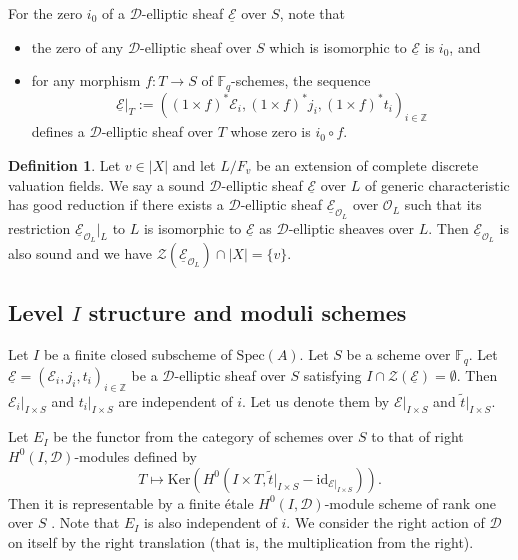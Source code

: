 \documentclass[10pt]{amsart}
\theoremstyle{plain}
\theoremstyle{definition}
\newtheorem{dfn}[thm]{Definition}
\newcommand{\id}{\mathrm{id}}
\newcommand{\Ker}{\mathrm{Ker}}
\newcommand{\Spec}{\mathrm{Spec}}
\newcommand{\cE}{\mathcal{E}}
\newcommand{\cO}{\mathcal{O}}
\newcommand{\cZ}{\mathcal{Z}}
\newcommand{\ucE}{\underline{\mathcal{E}}}
\newcommand{\bF}{\mathbb{F}}
\newcommand{\bZ}{\mathbb{Z}}
\newcommand{\sD}{\mathscr{D}}
\begin{document}
For the zero $i_0$ of a $\sD$-elliptic sheaf $\ucE$ over $S$, note that
\begin{itemize}
	\item the zero of any $\sD$-elliptic sheaf over $S$ which is isomorphic to $\ucE$ is $i_0$, and
	\item for any morphism $f:T\to S$ of $\bF_q$-schemes, the sequence
	\[
	\ucE|_T:=((1\times f)^*\cE_i,(1\times f)^*j_i,(1\times f)^*t_i)_{i\in \bZ}
	\]
	defines a $\sD$-elliptic sheaf over $T$ whose zero is $i_0\circ f$.
\end{itemize}


\begin{dfn}\label{DefGoodRed}
Let $v\in |X|$ and let $L/F_v$ be an extension of complete discrete valuation fields.
We say a sound $\sD$-elliptic sheaf $\ucE$ over $L$ of generic characteristic has good reduction 
if there exists a $\sD$-elliptic sheaf $\ucE_{\cO_L}$ over $\cO_L$ 
such that its restriction $\ucE_{\cO_L}|_L$ to $L$ is isomorphic to $\ucE$ as $\sD$-elliptic sheaves over $L$. 
Then $\ucE_{\cO_L}$ is also sound and we have $\cZ(\ucE_{\cO_L})\cap |X|=\{v\}$.
\end{dfn}



\subsection{Level $I$ structure and moduli schemes}\label{SubsecLevelStr}

Let $I$ be a finite closed subscheme of $\Spec(A)$. 
Let $S$ be a scheme over $\bF_q$.
Let $\underline{\cE}=(\cE_i,j_i,t_i)_{i\in \bZ}$ be a $\sD$-elliptic sheaf over $S$ 
satisfying $I\cap \cZ(\ucE)=\emptyset$.
Then $\cE_i|_{I\times S}$ and $t_i|_{I\times S}$ are independent of $i$.
Let us denote them by
$\cE|_{I\times S}$ and $\tilde{t}|_{I\times S}$.


Let $E_I$ be the functor from the category of schemes over $S$ to that of right $H^0(I,\sD)$-modules defined by
\[
T\mapsto \Ker(H^0(I\times T,\tilde{t}|_{I\times S}-\id_{\cE|_{I\times S}})).
\]
Then it is representable by a finite \'{e}tale $H^0(I,\sD)$-module scheme of rank one over $S$ \cite[Lemma 2.6]{LRS}.
Note that $E_I$ is also independent of $i$.
We consider the right action of $\sD$ on itself by the right translation (that is, the multiplication from the right).
\end{document}

